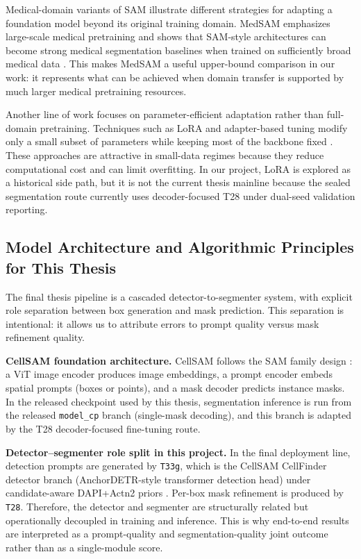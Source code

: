 Medical-domain variants of SAM illustrate different strategies for adapting a foundation model beyond its original training domain. MedSAM emphasizes large-scale medical pretraining and shows that SAM-style architectures can become strong medical segmentation baselines when trained on sufficiently broad medical data \cite{ma2024medsam}. This makes MedSAM a useful upper-bound comparison in our work: it represents what can be achieved when domain transfer is supported by much larger medical pretraining resources.

Another line of work focuses on parameter-efficient adaptation rather than full-domain pretraining. Techniques such as LoRA and adapter-based tuning modify only a small subset of parameters while keeping most of the backbone fixed \cite{hu2022lora}. These approaches are attractive in small-data regimes because they reduce computational cost and can limit overfitting. In our project, LoRA is explored as a historical side path, but it is not the current thesis mainline because the sealed segmentation route currently uses decoder-focused T28 under dual-seed validation reporting.

\subsection{Model Architecture and Algorithmic Principles for This Thesis}\label{model-architecture-and-algorithmic-principles-for-this-thesis}

The final thesis pipeline is a cascaded detector-to-segmenter system, with explicit role separation between box generation and mask prediction. This separation is intentional: it allows us to attribute errors to prompt quality versus mask refinement quality.

\textbf{CellSAM foundation architecture.}
CellSAM follows the SAM family design \cite{kirillov2023sam,israel2024cellsam}: a ViT image encoder produces image embeddings, a prompt encoder embeds spatial prompts (boxes or points), and a mask decoder predicts instance masks. In the released checkpoint used by this thesis, segmentation inference is run from the released \texttt{model\_cp} branch (single-mask decoding), and this branch is adapted by the T28 decoder-focused fine-tuning route.

\textbf{Detector--segmenter role split in this project.}
In the final deployment line, detection prompts are generated by \texttt{T33g}, which is the CellSAM CellFinder detector branch (AnchorDETR-style transformer detection head) under candidate-aware DAPI+Actn2 priors \cite{israel2024cellsam}. Per-box mask refinement is produced by \texttt{T28}. Therefore, the detector and segmenter are structurally related but operationally decoupled in training and inference. This is why end-to-end results are interpreted as a prompt-quality and segmentation-quality joint outcome rather than as a single-module score.

